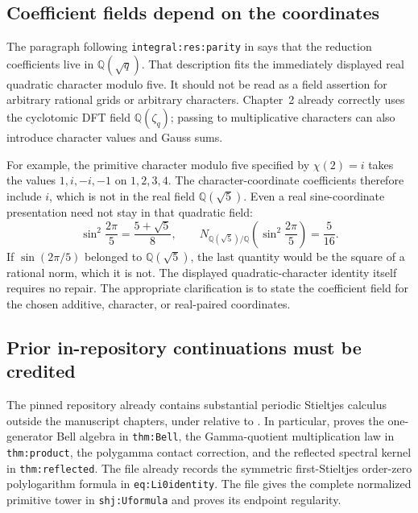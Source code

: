 \subsection{Coefficient fields depend on the coordinates}

The paragraph following \texttt{integral:res:parity} in
 says that the reduction coefficients
live in $\mathbb Q(\sqrt q)$.  That description fits the immediately
displayed real quadratic character modulo five.  It should not be read
as a field assertion for arbitrary rational grids or arbitrary
characters.  Chapter~2 already correctly uses the cyclotomic DFT field
$\mathbb Q(\zeta_q)$; passing to multiplicative characters can also
introduce character values and Gauss sums.

For example, the primitive character modulo five specified by
$\chi(2)=i$ takes the values $1,i,-i,-1$ on $1,2,3,4$.
The character-coordinate coefficients therefore include $i$, which is
not in the real field $\mathbb Q(\sqrt5)$.  Even a real sine-coordinate
presentation need not stay in that quadratic field:
\[
 \sin^2\frac{2\pi}{5}=\frac{5+\sqrt5}{8},\qquad
 N_{\mathbb Q(\sqrt5)/\mathbb Q}
      \left(\sin^2\frac{2\pi}{5}\right)=\frac5{16}.
\]
If $\sin(2\pi/5)$ belonged to $\mathbb Q(\sqrt5)$, the last
quantity would be the square of a rational norm, which it is not.
The displayed quadratic-character identity itself requires no repair.
The appropriate clarification is to state the coefficient field for
the chosen additive, character, or real-paired coordinates.

\subsection{Prior in-repository continuations must be credited}

The pinned repository already contains substantial periodic Stieltjes
calculus outside the manuscript chapters, under
relative to  \cite{RepoConvolutionAlgebra,RepoConvolutionCalculus,RepoShiftedJets}.
In particular,  proves the
one-generator Bell algebra in \texttt{thm:Bell}, the Gamma-quotient
multiplication law in \texttt{thm:product}, the polygamma contact
correction, and the reflected spectral kernel in
\texttt{thm:reflected}.  The file
already records the symmetric first-Stieltjes order-zero
polylogarithm formula in \texttt{eq:Li0identity}.
The file  gives the complete
normalized primitive tower in \texttt{shj:Uformula} and proves its
endpoint regularity.

